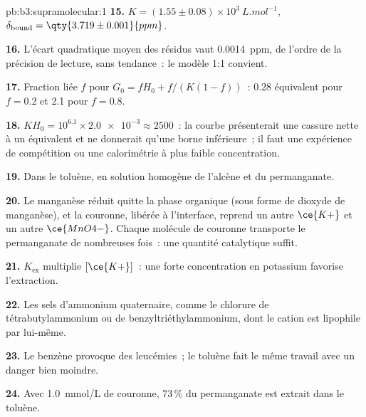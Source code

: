 \begin{solution}{pb:b3:supramolecular:1}
\textbf{15.} $K = (1.55 \pm 0.08) \times 10^3\ \unit{L.mol^{-1}}$, $\delta_{\mathrm{bound}} = \qty{3.719 \pm 0.001}{ppm}$.

\textbf{16.} L'écart quadratique moyen des résidus vaut \qty{0.0014}{ppm},
de l'ordre de la précision de lecture, sans tendance~: le modèle 1:1
convient.

\textbf{17.} Fraction liée $f$ pour $G_0 = fH_0 + f/(K(1 - f))$~: 0.28 équivalent pour $f = 0.2$ et 2.1 pour $f = 0.8$.

\textbf{18.} $KH_0 = 10^{6.1} \times \num{2.0e-3} \approx 2500$~: la courbe présenterait une cassure nette à un équivalent
et ne donnerait qu'une borne inférieure~; il faut une expérience de
compétition ou une calorimétrie à plus faible concentration.

\textbf{19.} Dans le toluène, en solution homogène de l'alcène et du permanganate.

\textbf{20.} Le manganèse réduit quitte la phase organique (sous forme de dioxyde de manganèse),
et la couronne, libérée à l'interface, reprend un autre $\ce{K+}$ et un autre $\ce{MnO4-}$. Chaque molécule de
couronne transporte le permanganate de nombreuses fois~: une quantité
catalytique suffit.

\textbf{21.} $K_{\mathrm{ex}}$ multiplie $[\ce{K+}]$~: une forte concentration en potassium favorise l'extraction.

\textbf{22.} Les sels d'ammonium quaternaire, comme le chlorure de
tétrabutylammonium ou de benzyltriéthylammonium, dont le cation est
lipophile par lui-même.

\textbf{23.} Le benzène provoque des leucémies~; le toluène fait le même
travail avec un danger bien moindre.

\textbf{24.} Avec \qty{1.0}{mmol/L} de couronne, 73\,\% du permanganate est
extrait dans le toluène.
\end{solution}
